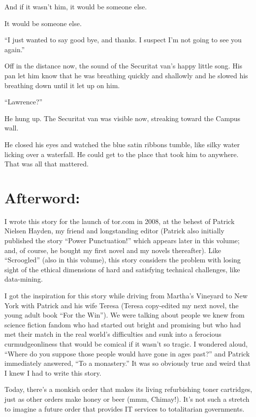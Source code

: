 And if it wasn't him, it would be someone else.

It would be someone else.

“I just wanted to say good bye, and thanks. I suspect I'm not going 
to see you again.”

Off in the distance now, the sound of the Securitat van's happy little 
song. His pan let him know that he was breathing quickly and shallowly 
and he slowed his breathing down until it let up on him.

“Lawrence?”

He hung up. The Securitat van was visible now, streaking toward the 
Campus wall.

He closed his eyes and watched the blue satin ribbons tumble, like 
silky water licking over a waterfall. He could get to the place that 
took him to anywhere. That was all that mattered.

\section{Afterword:}

I wrote this story for the launch of tor.com in 2008, at the behest of 
Patrick Nielsen Hayden, my friend and longstanding editor (Patrick also 
initially published the story “Power Punctuation!” which appears 
later in this volume; and, of course, he bought my first novel and my 
novels thereafter). Like “Scroogled” (also in this volume), this 
story considers the problem with losing sight of the ethical dimensions 
of hard and satisfying technical challenges, like data-mining.

I got the inspiration for this story while driving from Martha's 
Vineyard to New York with Patrick and his wife Teresa (Teresa 
copy-edited my next novel, the young adult book “For the Win”). We 
were talking about people we knew from science fiction fandom who had 
started out bright and promising but who had met their match in the 
real world's difficulties and sunk into a ferocious curmudgeonliness 
that would be comical if it wasn't so tragic. I wondered aloud, 
“Where do you suppose those people would have gone in ages past?” 
and Patrick immediately answered, “To a monastery.” It was so 
obviously true and weird that I knew I had to write this story.

Today, there's a monkish order that makes its living refurbishing toner 
cartridges, just as other orders make honey or beer (mmm, Chimay!). 
It's not such a stretch to imagine a future order that provides IT 
services to totalitarian governments.


